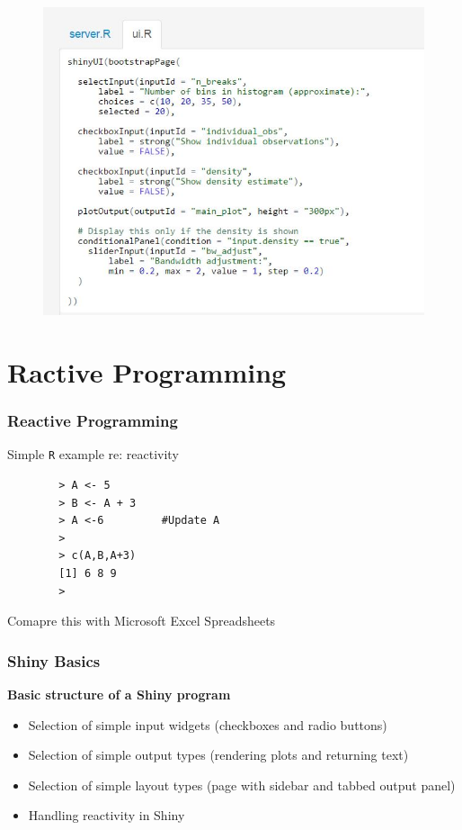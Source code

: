 \documentclass{beamer}
\begin{document}
\begin{frame}
	\begin{figure}
		\centering
		\includegraphics[width=0.9\linewidth]{01-ui}
	\end{figure}
\end{frame}

\section{Ractive Programming}
\begin{frame}[fragile]
	\Large
	\frametitle{Reactive Programming}
	
	Simple \texttt{R} example re: reactivity
	\begin{framed}
		\begin{verbatim}
		> A <- 5
		> B <- A + 3
		> A <-6         #Update A
		>
		> c(A,B,A+3)
		[1] 6 8 9
		>
		\end{verbatim}
	\end{framed}
	Comapre this with Microsoft Excel Spreadsheets
\end{frame}

\begin{frame}
	\frametitle{Shiny Basics}
	\Large
	\vspace{-0.5cm}
	\textbf{Basic structure of a Shiny program}
	\begin{itemize}
		\item  Selection of simple input widgets (checkboxes and radio buttons)
		\item  Selection of simple output types (rendering plots and returning text)
		\item  Selection of simple layout types (page with sidebar and tabbed output panel)
		\item  Handling reactivity in Shiny
	\end{itemize}
\end{frame}
\end{document}
